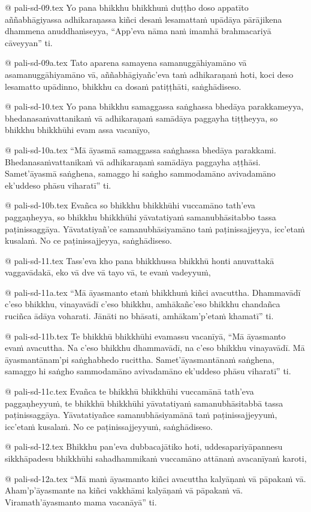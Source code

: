 @ pali-sd-09.tex
Yo pana bhikkhu bhikkhuṁ duṭṭho doso appatīto aññabhāgiyassa adhikaraṇassa kiñci desaṁ lesamattaṁ upādāya pārājikena dhammena anuddhaṁseyya, “App’eva nāma naṁ imamhā brahmacariyā cāveyyan” ti.

@ pali-sd-09a.tex
Tato aparena samayena samanuggāhiyamāno vā asamanuggāhiyamāno vā, aññabhāgiyañc’eva taṁ adhikaraṇaṁ hoti, koci deso lesamatto upādinno, bhikkhu ca dosaṁ patiṭṭhāti, saṅghādiseso.

@ pali-sd-10.tex
Yo pana bhikkhu samaggassa saṅghassa bhedāya parakkameyya, bhedanasaṁvattanikaṁ vā adhikaraṇaṁ samādāya paggayha tiṭṭheyya, so bhikkhu bhikkhūhi evam assa vacanīyo,

@ pali-sd-10a.tex
“Mā āyasmā samaggassa saṅghassa bhedāya parakkami. Bhedanasaṁvattanikaṁ vā adhikaraṇaṁ samādāya paggayha aṭṭhāsi. Samet’āyasmā saṅghena, samaggo hi saṅgho sammodamāno avivadamāno ek’uddeso phāsu viharatī” ti.

@ pali-sd-10b.tex
Evañca so bhikkhu bhikkhūhi vuccamāno tath’eva paggaṇheyya, so bhikkhu bhikkhūhi yāvatatiyaṁ samanubhāsitabbo tassa paṭinissaggāya. Yāvatatiyañ’ce samanubhāsiyamāno taṁ paṭinissajjeyya, icc’etaṁ kusalaṁ. No ce paṭinissajjeyya, saṅghādiseso.

@ pali-sd-11.tex
Tass’eva kho pana bhikkhussa bhikkhū honti anuvattakā vaggavādakā, eko vā dve vā tayo vā, te evaṁ vadeyyuṁ,

@ pali-sd-11a.tex
“Mā āyasmanto etaṁ bhikkhuṁ kiñci avacuttha. Dhammavādī c’eso bhikkhu, vinayavādī c’eso bhikkhu, amhākañc’eso bhikkhu chandañca ruciñca ādāya voharati. Jānāti no bhāsati, amhākam’p’etaṁ khamatī” ti.

@ pali-sd-11b.tex
Te bhikkhū bhikkhūhi evamassu vacanīyā, “Mā āyasmanto evaṁ avacuttha. Na c’eso bhikkhu dhammavādī, na c’eso bhikkhu vinayavādī. Mā āyasmantānam’pi saṅghabhedo rucittha. Samet’āyasmantānaṁ saṅghena, samaggo hi saṅgho sammodamāno avivadamāno ek’uddeso phāsu viharatī” ti.

@ pali-sd-11c.tex
Evañca te bhikkhū bhikkhūhi vuccamānā tath’eva paggaṇheyyuṁ, te bhikkhū bhikkhūhi yāvatatiyaṁ samanubhāsitabbā tassa paṭinissaggāya. Yāvatatiyañce samanubhāsiyamānā taṁ paṭinissajjeyyuṁ, icc’etaṁ kusalaṁ. No ce paṭinissajjeyyuṁ, saṅghādiseso.

@ pali-sd-12.tex
Bhikkhu pan’eva dubbacajātiko hoti, uddesapariyāpannesu sikkhāpadesu bhikkhūhi sahadhammikaṁ vuccamāno attānaṁ avacanīyaṁ karoti,

@ pali-sd-12a.tex
“Mā maṁ āyasmanto kiñci avacuttha kalyāṇaṁ vā pāpakaṁ vā. Aham’p’āyasmante na kiñci vakkhāmi kalyāṇaṁ vā pāpakaṁ vā. Viramath’āyasmanto mama vacanāyā” ti.

